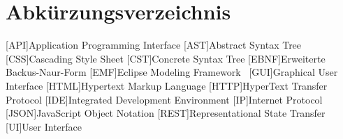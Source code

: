 \chapter*{Abkürzungsverzeichnis}


\begin{acronym}[JSONP]
    \setlength{\itemsep}{0pt}

    [API]{Application Programming Interface}
    [AST]{Abstract Syntax Tree}
    [CSS]{Cascading Style Sheet}
    [CST]{Concrete Syntax Tree}
    [EBNF]{Erweiterte Backus-Naur-Form}
    [EMF]{Eclipse Modeling Framework~\cite{emf}}
    [GUI]{Graphical User Interface}
    [HTML]{Hypertext Markup Language}
    [HTTP]{HyperText Transfer Protocol}
    [IDE]{Integrated Development Environment}
    [IP]{Internet Protocol}
    [JSON]{JavaScript Object Notation}
    [REST]{Representational State Transfer}
    [UI]{User Interface}
\end{acronym}

